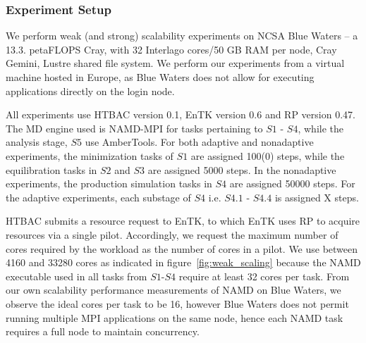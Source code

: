 \subsubsection{Experiment Setup}\label{ssec:exp_design}

We perform weak (and strong) scalability experiments on NCSA Blue Waters -- a
13.3. petaFLOPS Cray, with 32 Interlago cores/50 GB RAM per node, Cray Gemini,
Lustre shared file system. We perform our experiments from a virtual machine
hosted in Europe, as Blue Waters does not allow for executing applications
directly on the login node.

All experiments use HTBAC version 0.1, EnTK version 0.6 and RP version 0.47.
The MD engine used is NAMD-MPI for tasks pertaining to $S1$ - $S4$, while the
analysis stage, $S5$ use AmberTools. For both adaptive and nonadaptive
experiments, the minimization tasks of $S1$ are assigned 100(0) steps, while
the equilibration tasks in $S2$ and $S3$ are assigned 5000 steps. In the
nonadaptive experiments, the production simulation tasks in $S4$ are assigned
50000 steps. For the adaptive experiments, each substage of $S4$ i.e. $S4.1$ -
$S4.4$ is assigned X steps.

HTBAC submits a resource request to EnTK, to which EnTK uses RP to acquire
resources via a single pilot. Accordingly, we request the maximum number of
cores required by the workload as the number of cores in a pilot. We use
between 4160 and 33280 cores as indicated in figure~\ref{fig:weak_scaling}
because the NAMD executable used in all tasks from $S1$-$S4$ require at least
32 cores per task. From our own scalability performance measurements of NAMD
on Blue Waters, we observe the ideal cores per task to be 16, however Blue
Waters does not permit running multiple MPI applications on the same node,
hence each NAMD task requires a full node to maintain concurrency.

